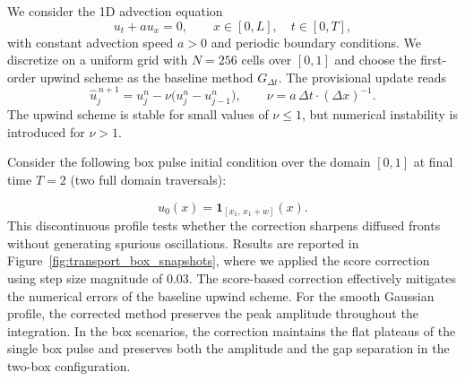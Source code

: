 \documentclass[letterpaper]{article} %
\begin{document}
We consider the 1D advection equation 
\begin{equation}
    u_t + a u_x = 0, \qquad x \in [0,L], \quad t \in [0,T],
\end{equation}
with constant advection speed $a > 0$ and periodic boundary conditions.
We discretize on a uniform grid with $N = 256$ cells over $[0,1]$ and choose the first-order upwind scheme as the baseline method $G_{\Delta t}$. The provisional update reads
\begin{equation}
    \hat{u}^{\,n+1}_j = u^n_j - \nu\bigl(u^n_j - u^n_{j-1}\bigr), \qquad \nu = {a\,\Delta t}\cdot{(\Delta x)^{-1}}.
\end{equation}
The upwind scheme is stable for small values of \(\nu \leq 1\), but numerical instability is introduced  for $\nu > 1$.









Consider the following box pulse initial condition over the domain $[0,1]$ at final time $T = 2$ (two full domain traversals):

\begin{equation}
    u_0(x) = \mathbf{1}_{[x_1,\, x_1 + w]}(x).
\end{equation}
This discontinuous profile tests whether the correction sharpens diffused fronts without generating spurious oscillations. Results are reported in Figure~\ref{fig:transport_box_snapshots}, where we applied the score correction using step size magnitude of $0.03$.
The score-based correction effectively mitigates the numerical errors of the baseline upwind scheme. For the smooth Gaussian profile, the corrected method preserves the peak amplitude throughout the integration. In the box scenarios, the correction maintains the flat plateaus of the single box pulse and preserves both the amplitude and the gap separation in the two-box configuration. 
\end{document}
